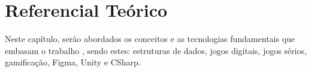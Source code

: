 \chapter{Referencial Teórico}

Neste capítulo, serão abordados os conceitos e as tecnologias fundamentais que embasam o trabalho \textit{\imprimirtitulo}, sendo estes: estruturas de dados, jogos digitais, jogos sérios, gamificação, Figma, Unity e CSharp.









